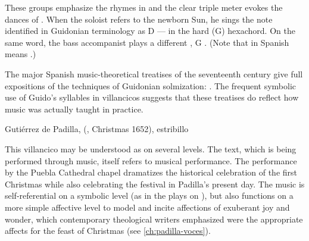 These groups emphasize the rhymes in 
and the clear triple meter evokes the dances of .
When the soloist refers to the newborn Sun, he sings the note identified in
Guidonian terminology as D --- in the hard (G)
hexachord.  
On the same word, the bass accompanist plays a different , G
. 
(Note that  in Spanish means .)%
\begin{Footnote}
    The major Spanish music-theoretical treatises of the seventeenth century
    give full expositions of the techniques of Guidonian solmization:
    \autocites{Cerone:Melopeo}{Lorente:Porque}.
    The frequent symbolic use of Guido's syllables in villancicos suggests that
    these treatises do reflect how music was actually taught in practice.
\end{Footnote}

{Gutiérrez de Padilla, 
(, Christmas 1652), estribillo}

This villancico may be understood as  on several
levels.  
The text, which is being performed through music, itself refers to musical
performance.
The performance by the Puebla Cathedral chapel dramatizes the historical
celebration of the first Christmas while also celebrating the festival in
Padilla's present day.  
The music is self-referential on a symbolic level (as in the plays on
), but also functions on a more simple affective level to model and
incite affections of exuberant joy and wonder, which contemporary theological
writers emphasized were the appropriate affects for the feast of Christmas (see
\cref{ch:padilla-voces}).

